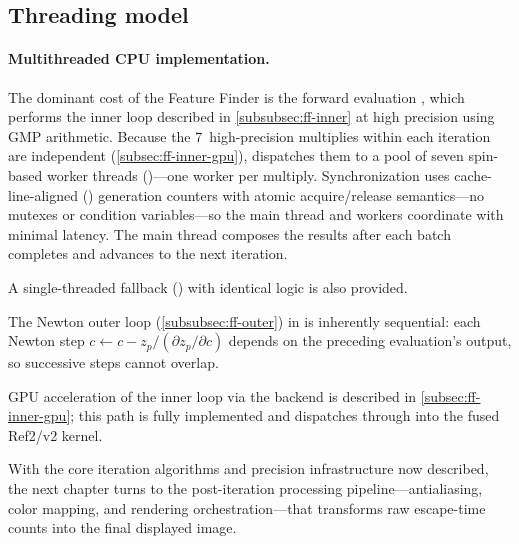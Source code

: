 \subsection{Threading model}
\label{subsec:ff-threading}

\paragraph{Multithreaded CPU implementation.}
The dominant cost of the Feature Finder is the forward evaluation
, which performs the inner loop
described in \cref{subsubsec:ff-inner} at high precision using GMP
 arithmetic.  Because the 7~high-precision multiplies within
each iteration are independent (\cref{subsec:ff-inner-gpu}),
\FractalShark{} dispatches them to a pool of seven spin-based worker
threads ()---one worker per multiply.
Synchronization uses cache-line-aligned () generation
counters with atomic acquire/release semantics---no mutexes or condition
variables---so the main thread and workers coordinate with minimal latency.
The main thread composes the results after each batch completes and
advances to the next iteration.

A single-threaded fallback () with
identical logic is also provided.

The Newton outer loop (\cref{subsubsec:ff-outer}) in
 is inherently sequential: each Newton step
$c \leftarrow c - z_p / (\partial z_p / \partial c)$ depends on the
preceding evaluation's output, so successive steps cannot overlap.

GPU acceleration of the inner loop via the  backend
is described in \cref{subsec:ff-inner-gpu}; this path is fully
implemented and dispatches through  into the
fused Ref2/v2 kernel.

With the core iteration algorithms and precision infrastructure now
described, the next chapter turns to the post-iteration processing
pipeline---antialiasing, color mapping, and rendering orchestration---that
transforms raw escape-time counts into the final displayed image.

